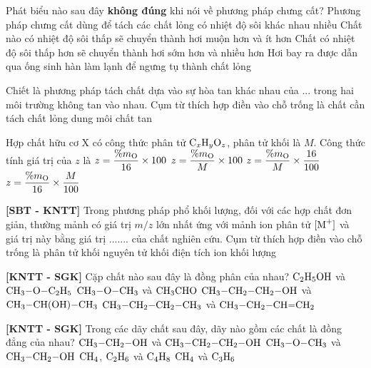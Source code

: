 \documentclass[12pt,a4paper]{article}
\begin{document}
\begin{ex}
Phát biểu nào sau đây \textbf{không đúng} khi nói về phương pháp chưng cất?
\choice
{Phương pháp chưng cất dùng để tách các chất lỏng có nhiệt độ sôi khác nhau nhiều}
{\True Chất nào có nhiệt độ sôi thấp sẽ chuyển thành hơi muộn hơn và ít hơn}
{Chất có nhiệt độ sôi thấp hơn sẽ chuyển thành hơi sớm hơn và nhiều hơn}
{Hơi bay ra được dẫn qua ống sinh hàn làm lạnh để ngưng tụ thành chất lỏng}

\end{ex}

\begin{ex}
Chiết là phương pháp tách chất dựa vào sự hòa tan khác nhau của ... trong hai môi trường không tan vào nhau. Cụm từ thích hợp điền vào chỗ trống là
\choice
{\True chất cần tách}
{chất lỏng}
{dung môi}
{chất tan}

\end{ex}

\begin{ex}
Hợp chất hữu cơ X có công thức phân tử $\ce{C_xH_yO_z}$, phân tử khối là $M$. Công thức tính giá trị của $z$ là
\choice
{$z = \dfrac{\%m_{\ce{O}}}{16} \times 100$}
{$z = \dfrac{\%m_{\ce{O}}}{M} \times 100$}
{$z = \dfrac{\%m_{\ce{O}}}{M} \times \dfrac{16}{100}$}
{\True $z = \dfrac{\%m_{\ce{O}}}{16} \times \dfrac{M}{100}$}

\end{ex}

\begin{ex}
\textbf{[SBT - KNTT]} Trong phương pháp phổ khối lượng, đối với các hợp chất đơn giản, thường mảnh có giá trị $m/z$ lớn nhất ứng với mảnh ion phân tử $[\ce{M+}]$ và giá trị này bằng giá trị ....... của chất nghiên cứu. Cụm từ thích hợp điền vào chỗ trống là
\choice
{\True phân tử khối}
{nguyên tử khối}
{điện tích ion}
{khối lượng}

\end{ex}

\begin{ex}
\textbf{[KNTT - SGK]} Cặp chất nào sau đây là đồng phân của nhau?
\choice
{$\ce{C2H5OH}$ và $\ce{CH3-O-C2H5}$}
{$\ce{CH3-O-CH3}$ và $\ce{CH3CHO}$}
{\True $\ce{CH3-CH2-CH2-OH}$ và $\ce{CH3-CH(OH)-CH3}$}
{$\ce{CH3-CH2-CH2-CH3}$ và $\ce{CH3-CH2-CH=CH2}$}

\end{ex}

\begin{ex}
\textbf{[KNTT - SGK]} Trong các dãy chất sau đây, dãy nào gồm các chất là đồng đẳng của nhau?
\choice
{\True $\ce{CH3-CH2-OH}$ và $\ce{CH3-CH2-CH2-OH}$}
{$\ce{CH3-O-CH3}$ và $\ce{CH3-CH2-OH}$}
{$\ce{CH4}$, $\ce{C2H6}$ và $\ce{C4H8}$}
{$\ce{CH4}$ và $\ce{C3H6}$}

\end{ex}
\end{document}
